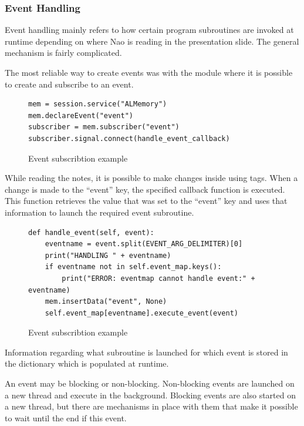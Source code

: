 \documentclass[12pt, fleqn, a4paper]{article}
\begin{document}
\subsubsection{Event Handling}
Event handling mainly refers to how certain program subroutines are invoked at runtime depending on where Nao is reading in the presentation slide. The general mechanism is fairly complicated.\par
The most reliable way to create events was with the  module where it is possible to create and subscribe to an event.
\begin{figure}[H]
	\centering
	\begin{verbatim}
mem = session.service("ALMemory")
mem.declareEvent("event")
subscriber = mem.subscriber("event")
subscriber.signal.connect(handle_event_callback)
	\end{verbatim}
	\caption{Event subscribtion example}
\end{figure}
While reading the notes, it is possible to make changes inside  using tags. When a change is made to the \enquote{event} key, the specified callback function is executed. This function retrieves the value that was set to the \enquote{event} key and uses that information to launch the required event subroutine.
\begin{figure}[H]
	\centering
	\begin{verbatim}
def handle_event(self, event):
    eventname = event.split(EVENT_ARG_DELIMITER)[0]
    print("HANDLING " + eventname)
    if eventname not in self.event_map.keys():
        print("ERROR: eventmap cannot handle event:" + eventname)
    mem.insertData("event", None)
    self.event_map[eventname].execute_event(event)
	\end{verbatim}
	\caption{Event subscribtion example}
\end{figure}
Information regarding what subroutine is launched for which event is stored in the  dictionary which is populated at runtime.\par
An event may be blocking or non-blocking. Non-blocking events are launched on a new thread and execute in the background. Blocking events are also started on a new thread, but there are mechanisms in place with them that make it possible to wait until the end if this event.
\end{document}
